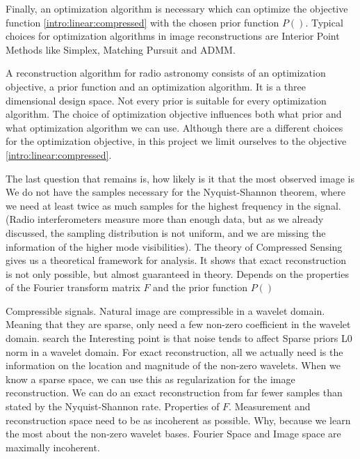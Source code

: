 Finally, an optimization algorithm is necessary which can optimize the objective function \eqref{intro:linear:compressed} with the chosen prior function $P()$. Typical choices for optimization algorithms in image reconstructions are Interior Point Methods like Simplex, Matching Pursuit \cite{hogbom1974aperture} and ADMM\cite{carrillo2014purify}. 

A reconstruction algorithm for radio astronomy consists of an optimization objective, a prior function and an optimization algorithm. It is a three dimensional design space. Not every prior is suitable for every optimization algorithm. The choice of optimization objective influences both what prior and what optimization algorithm we can use. Although there are a different choices for the optimization objective, in this project we limit ourselves to the objective \eqref{intro:linear:compressed}.

The last question that remains is, how likely is it that the most observed image is
We do not have the samples necessary for the Nyquist-Shannon theorem, where we need at least twice as much samples for the highest frequency in the signal. (Radio interferometers measure more than enough data, but as we already discussed, the sampling distribution is not uniform, and we are missing the information of the higher mode visibilities).
The theory of Compressed Sensing\cite{candes2006robust,donoho2006compressed} gives us a theoretical framework for analysis. It shows that exact reconstruction is not only possible, but almost guaranteed in theory.
Depends on the properties of the Fourier transform matrix $F$ and the prior function $P()$

Compressible signals. Natural image are compressible in a wavelet domain. Meaning that they are sparse, only need a few non-zero coefficient in the wavelet domain. search the Interesting point is that noise tends to affect
Sparse priors L0 norm in a wavelet domain. For exact reconstruction, all we actually need is the information on the location and magnitude of the non-zero wavelets.
When we know a sparse space, we can use this as regularization for the image reconstruction.
We can do an exact reconstruction from far fewer samples than stated by the Nyquist-Shannon rate. 
Properties of $F$. Measurement and reconstruction space need to be as incoherent as possible.
Why, because we learn the most about the non-zero wavelet bases.
Fourier Space and Image space are maximally incoherent. 

